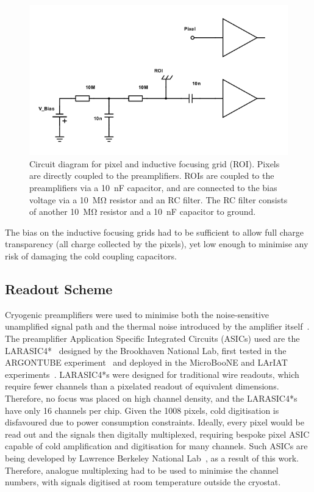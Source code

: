 \documentclass[instruments,article,submit,moreauthors,pdftex]{Definitions/mdpi}
\begin{document}
\begin{figure}[htb]
	\centering
	\includegraphics[width=0.65\linewidth]{Figures/schemeit-project.png}
	\caption{Circuit diagram for pixel and inductive focusing grid (ROI). Pixels are directly coupled to the preamplifiers. ROIs are coupled to the preamplifiers via a \SI{10}{\nano\farad} capacitor, and are connected to the bias voltage via a \SI{10}{\mega\ohm} resistor and an RC filter. The RC filter consists of another \SI{10}{\mega\ohm} resistor and a \SI{10}{\nano\farad} capacitor to ground.}
	\label{fig:circuit}
\end{figure}

The bias on the inductive focusing grids had to be sufficient to allow full charge transparency (all charge collected by the pixels), yet low enough to minimise any risk of damaging the cold coupling capacitors.

\subsection{Readout Scheme}

Cryogenic preamplifiers were used to minimise both the noise-sensitive unamplified signal path and the thermal noise introduced by the amplifier itself~\cite{art_cold_ero}.
The preamplifier Application Specific Integrated Circuits (ASICs) used are the LARASIC4*~\cite{larasic} designed by the Brookhaven National Lab, first tested in the ARGONTUBE experiment~\cite{art_cold_ero} and deployed in the MicroBooNE and LArIAT experiments~\cite{uboner,lariat}.
LARASIC4*s were designed for traditional wire readouts, which require fewer channels than a pixelated readout of equivalent dimensions. 
Therefore, no focus was placed on high channel density, and the LARASIC4*s have only 16 channels per chip.
Given the 1008 pixels, cold digitisation is disfavoured due to power consumption constraints. 
Ideally, every pixel would be read out and the signals then digitally multiplexed, requiring bespoke pixel ASIC capable of cold amplification and digitisation for many channels.
Such ASICs are being developed by Lawrence Berkeley National Lab~\cite{larpix}, as a result of this work. 
Therefore, analogue multiplexing had to be used to minimise the channel numbers, with signals digitised at room temperature outside the cryostat.
\end{document}
